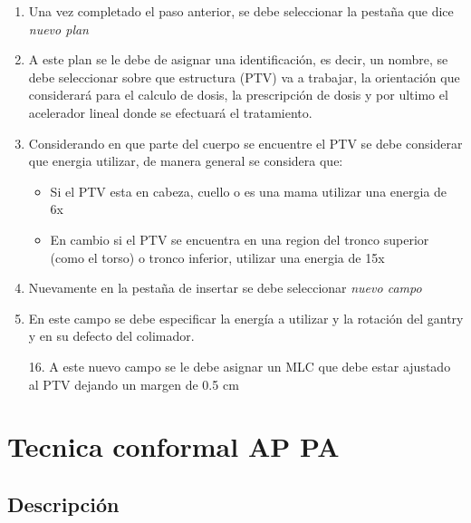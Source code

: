 \documentclass{article}
\begin{document}
\begin{tcolorbox}[colback= pastelgreen, colframe= lincolngreen, title={Consideraciones iniciales}, center title]
\begin{enumerate}
        \item Una vez completado el paso anterior, se debe seleccionar la pestaña que dice \textit{nuevo plan}
        \item A este plan se le debe de asignar una identificación, es decir, un nombre, se debe seleccionar sobre que estructura (PTV) va a trabajar, la orientación que considerará para el calculo de dosis, la prescripción de dosis y por ultimo el acelerador lineal donde se efectuará el tratamiento.
        \item Considerando en que parte del cuerpo se encuentre el PTV se debe considerar que energia utilizar, de manera general se considera que:
            \begin{itemize}
                \item Si el PTV esta en cabeza, cuello o es una mama utilizar una energia de 6x
                \item En cambio si el PTV se encuentra en una region del tronco superior (como el torso) o tronco inferior, utilizar una energia de 15x
            \end{itemize} 
        \item Nuevamente en la pestaña de insertar se debe seleccionar \textit{nuevo campo}
        \item En este campo se debe especificar la energía a utilizar y la rotación del gantry y en su defecto del colimador.
        
    \end{enumerate}

\end{tcolorbox}


\begin{tcolorbox}[colback=pastelgreen]

    \begin{enumerate}
        \item[16.] A este nuevo campo se le debe asignar un MLC que debe estar ajustado al PTV dejando un margen de 0.5 cm
    \end{enumerate}
    
\end{tcolorbox}



\section{Tecnica conformal AP PA}


\subsection{Descripción}
\end{document}
